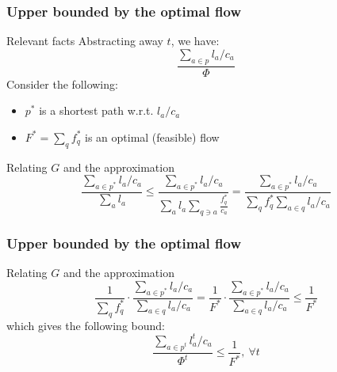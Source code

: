 \documentclass{beamer}
\begin{document}
\begin{frame}
    \frametitle{Upper bounded by the optimal flow}

    \begin{block}{Relevant facts}
        Abstracting away $t$, we have:
        \begin{equation*}
            \frac{\sum_{a\in p} l_a / c_a}{\Phi}
        \end{equation*}
        Consider the following:
        \begin{itemize}
            \item $p^*$ is a shortest path w.r.t. $l_a / c_a$
            \item $F^* = \sum_q f_q^*$ is an optimal (feasible) flow
        \end{itemize}
    \end{block}

    \begin{block}{Relating $G$ and the approximation}
\begin{equation*}
\dfrac{\sum_{a \in p^*} l_a / c_a}{\sum_a l_a}
\leq
\dfrac{\sum_{a \in p^*} l_a / c_a}
{\sum_a l_a \sum_{q\ni a} \frac{f_q^*}{c_a}}
=
\dfrac{\sum_{a \in p^*} l_a / c_a}
{\sum_q f_q^* \sum_{a\in q} l_a / c_a}
\end{equation*}
    \end{block}

\end{frame}

\begin{frame}
    \frametitle{Upper bounded by the optimal flow}

    \begin{block}{Relating $G$ and the approximation}
\begin{equation*}
\dfrac{1}{ \sum_{q} f_q^*}
\cdot
\dfrac{\sum_{a \in p^*} l_a / c_a}
{\sum_{a\in q} l_a / c_a}
=
\dfrac{1}{F^*}
\cdot
\dfrac{\sum_{a \in p^*} l_a / c_a}
{\sum_{a\in q} l_a / c_a}
\leq
\dfrac{1}{F^*}
\end{equation*}
which gives the following bound:
\begin{equation*}
\dfrac{\sum_{a \in p^t} l_a^t / c_a}{\Phi^t}
\leq
\dfrac{1}{F^*},~\forall t \label{bound}
\end{equation*}
    \end{block}

\end{frame}
\end{document}
